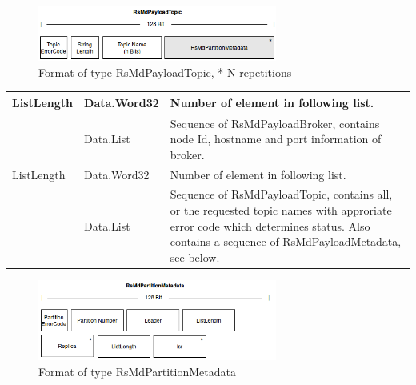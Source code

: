 \begin{figure}[H]
    \centering
    \includegraphics[width=0.7\textwidth]{images/impl-prot-types-mdPayloadTopic.png}
    \caption{Format of type RsMdPayloadTopic, * N repetitions} 
\end{figure}


\begin{table}[H]
\centering
\begin{tabular}{ l  l  p{10cm} }
\hline
ListLength        & Data.Word32     & Number of element in following list.\\ \hline
[RsMdPayloadBroker] & Data.List     & Sequence of RsMdPayloadBroker, contains
node Id, hostname and port information of broker.  \\ \hline
ListLength        & Data.Word32     & Number of element in following list.\\ \hline
[RsMdPayloadTopic] & Data.List     & Sequence of RsMdPayloadTopic, contains all,
or the requested topic names with approriate error code which determines status.
Also contains a sequence of RsMdPayloadMetadata, see below. \\ \hline
\end{tabular}
\end{table}

\begin{figure}[H]
    \centering
    \includegraphics[width=0.7\textwidth]{images/impl-prot-types-mdPartitionMetadata.png}
    \caption{Format of type RsMdPartitionMetadata} 
\end{figure}

